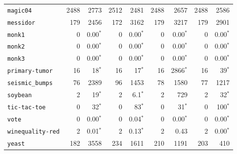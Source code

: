 \begin{tabular}{lrrrrrrrr}
\texttt{magic04} & 2488 & 2773 & 2512 & 2481 & 2488 & 2657 & 2488 & 2586\\
\texttt{messidor} & 179 & 2456 & 172 & 3162 & 179 & 3217 & 179 & 2901\\
\texttt{monk1} & 0 & 0.00$^*$ & 0 & 0.00$^*$ & 0 & 0.00$^*$ & 0 & 0.00$^*$\\
\texttt{monk2} & 0 & 0.00$^*$ & 0 & 0.00$^*$ & 0 & 0.00$^*$ & 0 & 0.00$^*$\\
\texttt{monk3} & 0 & 0.00$^*$ & 0 & 0.00$^*$ & 0 & 0.00$^*$ & 0 & 0.00$^*$\\
\texttt{primary-tumor} & 16 & 18$^*$ & 16 & 17$^*$ & 16 & 2866$^*$ & 16 & 39$^*$\\
\texttt{seismic\_bumps} & 76 & 2389 & 96 & 1453 & 78 & 1580 & 77 & 1217\\
\texttt{soybean} & 2 & 19$^*$ & 2 & 6.1$^*$ & 2 & 729 & 2 & 32$^*$\\
\texttt{tic-tac-toe} & 0 & 32$^*$ & 0 & 83$^*$ & 0 & 31$^*$ & 0 & 100$^*$\\
\texttt{vote} & 0 & 0.00$^*$ & 0 & 0.04$^*$ & 0 & 0.00$^*$ & 0 & 0.00$^*$\\
\texttt{winequality-red} & 2 & 0.01$^*$ & 2 & 0.13$^*$ & 2 & 0.43 & 2 & 0.00$^*$\\
\texttt{yeast} & 182 & 3558 & 234 & 1611 & 210 & 1191 & 203 & 410\\
\bottomrule
\end{tabular}
